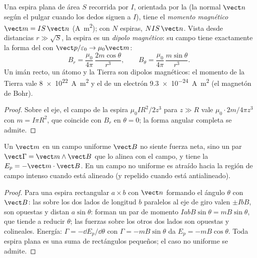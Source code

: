 \begin{definition}\label{def:b1:magnetostatics:moment}
Una espira plana de área $S$ recorrida por $I$, orientada por la  (la normal $\vect n$ según el pulgar cuando los dedos
siguen a $I$), tiene el \emph{momento magnético} $\vect m = IS\,\vect n$ (\unit{A.m^2}); con $N$
espiras, $NIS\,\vect n$. Vista desde distancias $r \gg \sqrt S$, la espira
es un \emph{dipolo magnético}: su campo tiene exactamente la forma del
 con $\vect p/\varepsilon_0 \to \mu_0\vect m$:
\[
B_r = \frac{\mu_0}{4\pi}\,\frac{2m\cos\theta}{r^3}, \qquad
B_\theta = \frac{\mu_0}{4\pi}\,\frac{m\sin\theta}{r^3} .
\]
Un imán recto, un átomo y la Tierra son dipolos magnéticos: el momento de
la Tierra vale \qty{8e22}{A.m^2} y el de un electrón \qty{9.3e-24}{A.m^2}
(el magnetón de Bohr).
\end{definition}

\begin{proof}
Sobre el eje, el campo de la espira $\mu_0IR^2/2z^3$ para $z \gg R$ vale
$\mu_0 \cdot 2m/4\pi z^3$ con $m = I\pi R^2$, que coincide con $B_r$ en $\theta = 0$;
la forma angular completa se admite.
\end{proof}

\begin{theorem}\label{thm:b1:magnetostatics:dipoleinfield}
Un  $\vect m$ en un campo uniforme $\vect B$ no siente
fuerza neta, sino un par $\vect\Gamma = \vect m\wedge\vect B$ que lo
alinea con el campo, y tiene la  $E_p = -\vect m\cdot\vect B$.
En un campo no uniforme es atraído hacia la región de campo intenso
cuando está alineado (y repelido cuando está antialineado).
\end{theorem}

\begin{proof}
Para una espira rectangular $a \times b$ con $\vect n$ formando el ángulo
$\theta$ con $\vect B$: las  sobre los dos lados de
longitud $b$ paralelos al eje de giro valen $\pm IbB$, son opuestas y
distan $a\sin\theta$: forman un par de momento
$IabB\sin\theta = mB\sin\theta$, que tiende a reducir $\theta$; las
fuerzas sobre los otros dos lados son opuestas y colineales. Energía:
$\Gamma = -\dd E_p/\dd\theta$ con $\Gamma = -mB\sin\theta$ da
$E_p = -mB\cos\theta$. Toda espira plana es una suma de rectángulos
pequeños; el caso no uniforme se admite.
\end{proof}

